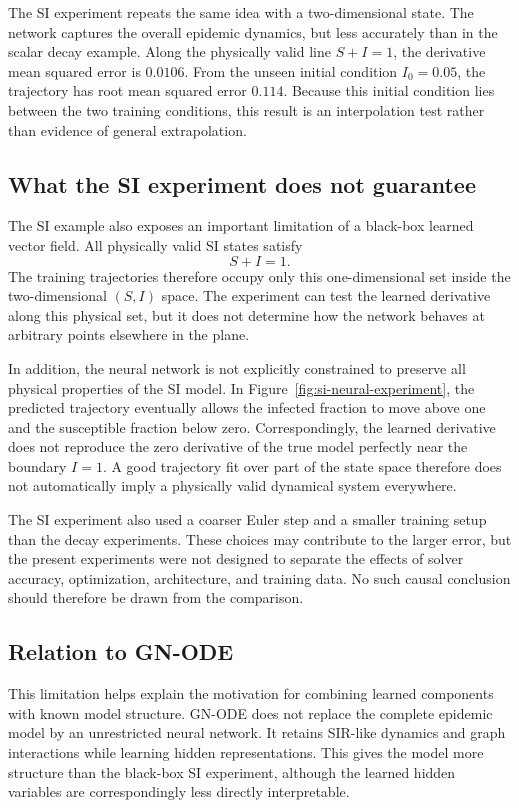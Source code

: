 \documentclass[11pt,a4paper]{article}
\begin{document}
The SI experiment repeats the same idea with a two-dimensional state. The
network captures the overall epidemic dynamics, but less accurately than in
the scalar decay example. Along the physically valid line $S+I=1$, the
derivative mean squared error is $0.0106$. From the unseen initial condition
$I_0=0.05$, the trajectory has root mean squared error $0.114$. Because this
initial condition lies between the two training conditions, this result is an
interpolation test rather than evidence of general extrapolation.

\subsection{What the SI experiment does not guarantee}

The SI example also exposes an important limitation of a black-box learned
vector field. All physically valid SI states satisfy
\[
    S+I=1.
\]
The training trajectories therefore occupy only this one-dimensional set
inside the two-dimensional $(S,I)$ space. The experiment can test the learned
derivative along this physical set, but it does not determine how the network
behaves at arbitrary points elsewhere in the plane.

In addition, the neural network is not explicitly constrained to preserve all
physical properties of the SI model. In Figure~\ref{fig:si-neural-experiment},
the predicted trajectory eventually allows the infected fraction to move above
one and the susceptible fraction below zero. Correspondingly, the learned
derivative does not reproduce the zero derivative of the true model perfectly
near the boundary $I=1$. A good trajectory fit over part of the state space
therefore does not automatically imply a physically valid dynamical system
everywhere.

The SI experiment also used a coarser Euler step and a smaller training setup
than the decay experiments. These choices may contribute to the larger error,
but the present experiments were not designed to separate the effects of
solver accuracy, optimization, architecture, and training data. No such causal
conclusion should therefore be drawn from the comparison.

\subsection{Relation to GN-ODE}

This limitation helps explain the motivation for combining learned components
with known model structure. GN-ODE does not replace the complete epidemic
model by an unrestricted neural network. It retains SIR-like dynamics and
graph interactions while learning hidden representations. This gives the
model more structure than the black-box SI experiment, although the learned
hidden variables are correspondingly less directly interpretable.
\end{document}
